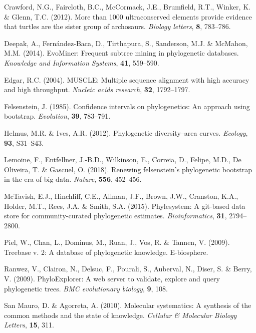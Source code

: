 \documentclass[]{article}
\begin{document}
\leavevmode\hypertarget{ref-crawford2012more}{}%
Crawford, N.G., Faircloth, B.C., McCormack, J.E., Brumfield, R.T., Winker, K. \& Glenn, T.C. (2012). More than 1000 ultraconserved elements provide evidence that turtles are the sister group of archosaurs. \emph{Biology letters}, \textbf{8}, 783--786.

\leavevmode\hypertarget{ref-deepak2014evominer}{}%
Deepak, A., Fernández-Baca, D., Tirthapura, S., Sanderson, M.J. \& McMahon, M.M. (2014). EvoMiner: Frequent subtree mining in phylogenetic databases. \emph{Knowledge and Information Systems}, \textbf{41}, 559--590.

\leavevmode\hypertarget{ref-edgar2004muscle}{}%
Edgar, R.C. (2004). MUSCLE: Multiple sequence alignment with high accuracy and high throughput. \emph{Nucleic acids research}, \textbf{32}, 1792--1797.

\leavevmode\hypertarget{ref-felsenstein1985confidence}{}%
Felsenstein, J. (1985). Confidence intervals on phylogenetics: An approach using bootstrap. \emph{Evolution}, \textbf{39}, 783--791.

\leavevmode\hypertarget{ref-helmus2012phylogenetic}{}%
Helmus, M.R. \& Ives, A.R. (2012). Phylogenetic diversity--area curves. \emph{Ecology}, \textbf{93}, S31--S43.

\leavevmode\hypertarget{ref-lemoine2018renewing}{}%
Lemoine, F., Entfellner, J.-B.D., Wilkinson, E., Correia, D., Felipe, M.D., De Oliveira, T. \& Gascuel, O. (2018). Renewing felsenstein's phylogenetic bootstrap in the era of big data. \emph{Nature}, \textbf{556}, 452--456.

\leavevmode\hypertarget{ref-mctavish2015phylesystem}{}%
McTavish, E.J., Hinchliff, C.E., Allman, J.F., Brown, J.W., Cranston, K.A., Holder, M.T., Rees, J.A. \& Smith, S.A. (2015). Phylesystem: A git-based data store for community-curated phylogenetic estimates. \emph{Bioinformatics}, \textbf{31}, 2794--2800.

\leavevmode\hypertarget{ref-piel2009treebase}{}%
Piel, W., Chan, L., Dominus, M., Ruan, J., Vos, R. \& Tannen, V. (2009). Treebase v. 2: A database of phylogenetic knowledge. E-biosphere.

\leavevmode\hypertarget{ref-ranwez2009phyloexplorer}{}%
Ranwez, V., Clairon, N., Delsuc, F., Pourali, S., Auberval, N., Diser, S. \& Berry, V. (2009). PhyloExplorer: A web server to validate, explore and query phylogenetic trees. \emph{BMC evolutionary biology}, \textbf{9}, 108.

\leavevmode\hypertarget{ref-san2010molecular}{}%
San Mauro, D. \& Agorreta, A. (2010). Molecular systematics: A synthesis of the common methods and the state of knowledge. \emph{Cellular \& Molecular Biology Letters}, \textbf{15}, 311.
\end{document}
